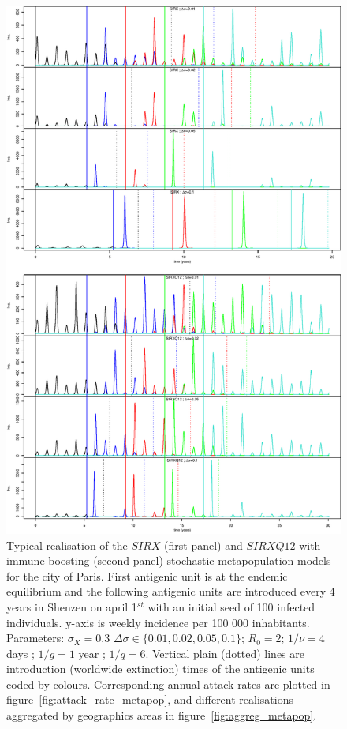 \begin{figure}[!htbp]
  \center
  \includegraphics[width=0.8\linewidth]{texte/article3/appendix_diamond/graph/traj_metapop.eps}
  \caption{Typical realisation of the $SIRX$ (first panel) and
    $SIRXQ12$ with immune boosting (second panel) stochastic
    metapopulation models for the city of Paris. First antigenic unit
    is at the endemic equilibrium and the following antigenic units
    are introduced every 4 years in Shenzen on april 1$^{st}$ with an
    initial seed of 100 infected individuals. y-axis is weekly
    incidence per 100 000 inhabitants. Parameters: $\sigma_X=0.3$
    $\Delta\sigma\in\{0.01, 0.02, 0.05, 0.1\}$; $R_0=2$; $1/\nu=4$
    days ; $1/g=1$ year ; $1/q=6$. Vertical plain (dotted) lines are
    introduction (worldwide extinction) times of the antigenic units
    coded by colours. Corresponding annual attack rates are plotted in
    figure~\ref{fig:attack_rate_metapop}, and different realisations
    aggregated by geographics areas in
    figure~\ref{fig:aggreg_metapop}.}
  \label{fig:world_sirx}
\end{figure}



